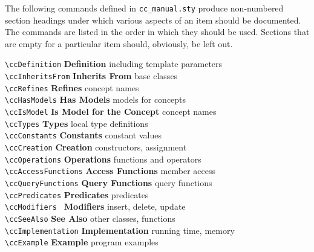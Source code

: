 The following commands defined in {\tt cc\_manual.sty} produce non-numbered
section headings under which various aspects of an item should be documented.
The commands are listed in the order in which they should be used.  Sections
that are empty for a particular item should, obviously, be left out.

\begin{tabbing}
  \> \verb+\ccDefinition+      \>  {\bf Definition}    \>
                                          including template parameters\\
  \> \verb+\ccInheritsFrom+    \>  {\bf Inherits From}     \>
                                                     base classes\\
  \> \verb+\ccRefines+         \>  {\bf Refines}     \>
                                                     concept names\\
  \> \verb+\ccHasModels+       \>  {\bf Has Models}     \>
                                                     models for concepts\\
  \> \verb+\ccIsModel+         \>  {\bf Is Model for the Concept}     \>
                                                     concept names\\
  \> \verb+\ccTypes+           \>  {\bf Types}         \>
                                                     local type definitions\\
  \> \verb+\ccConstants+       \>  {\bf Constants}     \>
                                                     constant values\\
  \> \verb+\ccCreation+        \>  {\bf Creation}      \>
                                                     constructors, assignment\\
  \> \verb+\ccOperations+      \>  {\bf Operations}    \>
                                                     functions and operators\\
  \> \verb+\ccAccessFunctions+ \>  {\bf Access Functions}    \>
                                                     member access\\
  \> \verb+\ccQueryFunctions+ \>   {\bf Query Functions}    \>
                                                     query functions\\
  \> \verb+\ccPredicates+      \>  {\bf Predicates}    \>
                                                     predicates\\
  \> \verb+\ccModifiers +      \>  {\bf Modifiers}    \>
                                                     insert, delete, update\\
  \> \verb+\ccSeeAlso+         \>  {\bf See Also}\>
                                                     other classes, functions\\
  \> \verb+\ccImplementation+  \>  {\bf Implementation}\>
                                                     running time, memory\\
  \> \verb+\ccExample+         \>  {\bf Example}       \>
                                                     program examples
\end{tabbing}


